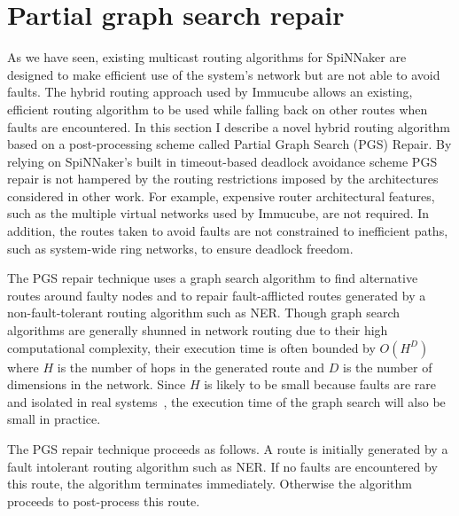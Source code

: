 	\section{Partial graph search repair}
		
		As we have seen, existing multicast routing algorithms for SpiNNaker are
		designed to make efficient use of the system's network but are not able to
		avoid faults. The hybrid routing approach used by Immucube allows an
		existing, efficient routing algorithm to be used while falling back on
		other routes when faults are encountered.  In this section I describe a
		novel hybrid routing algorithm based on a post-processing scheme called
		Partial Graph Search (PGS) Repair.  By relying on SpiNNaker's built in
		timeout-based deadlock avoidance scheme PGS repair is not hampered by the
		routing restrictions imposed by the architectures considered in other work.
		For example, expensive router architectural features, such as the multiple
		virtual networks used by Immucube, are not required. In addition, the
		routes taken to avoid faults are not constrained to inefficient paths, such
		as system-wide ring networks, to ensure deadlock freedom.
		
		The PGS repair technique uses a graph search algorithm to find alternative
		routes around faulty nodes and to repair fault-afflicted routes generated
		by a non-fault-tolerant routing algorithm such as NER. Though graph search
		algorithms are generally shunned in network routing due to their high
		computational complexity, their execution time is often bounded by $O(H^D)$
		where $H$ is the number of hops in the generated route and $D$ is the
		number of dimensions in the network.  Since $H$ is likely to be small
		because faults are rare and isolated in real
		systems~\cite{gara05,alverson12}, the execution time of the graph search
		will also be small in practice.
		
		The PGS repair technique proceeds as follows. A route is initially
		generated by a fault intolerant routing algorithm such as NER. If no faults
		are encountered by this route, the algorithm terminates immediately.
		Otherwise the algorithm proceeds to post-process this route.
		
